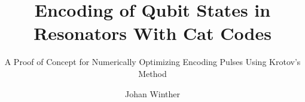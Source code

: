 \documentclass[masters,a4paper]{chalmers-thesis}
\title{Encoding of Qubit States in Resonators With Cat Codes}
\subtitle{A Proof of Concept for Numerically Optimizing Encoding Pulses Using Krotov's Method} %
\author{Johan Winther}
\begin{document}
\maketitle


\clearpage{}

\clearpage{}

\clearpage{}

\clearpage{}

\clearpage{}


\clearpage{}
\printbibliography{} %

\clearpage{}
\appendix

\end{document}

